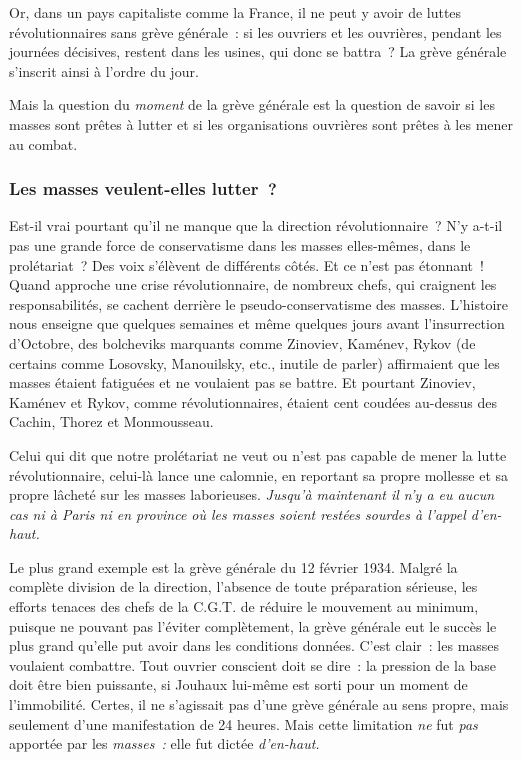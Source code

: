 \documentclass[french,twoside]{book} %
\begin{document}
Or, dans un pays capitaliste comme la France, il ne peut y avoir de luttes révolutionnaires sans grève générale : si les ouvriers et les ouvrières, pendant les journées décisives, restent dans les usines, qui donc se battra ? La grève générale s’inscrit ainsi à l’ordre du jour.\par
Mais la question du \emph{moment} de la grève générale est la question de savoir si les masses sont prêtes à lutter et si les organisations ouvrières sont prêtes à les mener au combat.
\subsubsection[{Les masses veulent-elles lutter ?}]{Les masses veulent-elles lutter ?}
\noindent Est-il vrai pourtant qu’il ne manque que la direction révolutionnaire ? N’y a-t-il pas une grande force de conservatisme dans les masses elles-mêmes, dans le prolétariat ? Des voix s’élèvent de différents côtés. Et ce n’est pas étonnant ! Quand approche une crise révolutionnaire, de nombreux chefs, qui craignent les responsabilités, se cachent derrière le pseudo-conservatisme des masses. L’histoire nous enseigne que quelques semaines et même  quelques jours avant l’insurrection d’Octobre, des bolcheviks marquants comme Zinoviev, Kaménev, Rykov (de certains comme Losovsky, Manouilsky, etc., inutile de parler) affirmaient que les masses étaient fatiguées et ne voulaient pas se battre. Et pourtant Zinoviev, Kaménev et Rykov, comme révolutionnaires, étaient cent coudées au-dessus des Cachin, Thorez et Monmousseau.\par
Celui qui dit que notre prolétariat ne veut ou n’est pas capable de mener la lutte révolutionnaire, celui-là lance une calomnie, en reportant sa propre mollesse et sa propre lâcheté sur les masses laborieuses. \emph{Jusqu’à maintenant il n’y a eu aucun cas ni à Paris ni en province où les masses soient restées sourdes à l’appel d’en-haut.}\par
Le plus grand exemple est la grève générale du 12 février 1934. Malgré la complète division de la direction, l’absence de toute préparation sérieuse, les efforts tenaces des chefs de la C.G.T. de réduire le mouvement au minimum, puisque ne pouvant pas l’éviter complètement, la grève générale eut le succès le plus grand qu’elle put avoir dans les conditions données. C’est clair : les masses voulaient combattre. Tout ouvrier conscient doit se dire : la pression de la base doit être bien puissante, si Jouhaux lui-même est sorti pour un moment de l’immobilité. Certes, il ne s’agissait pas d’une grève générale au sens propre, mais seulement d’une manifestation de 24 heures. Mais cette limitation \emph{ne} fut \emph{pas} apportée par les \emph{masses :} elle fut dictée \emph{d’en-haut.}\par
\end{document}
